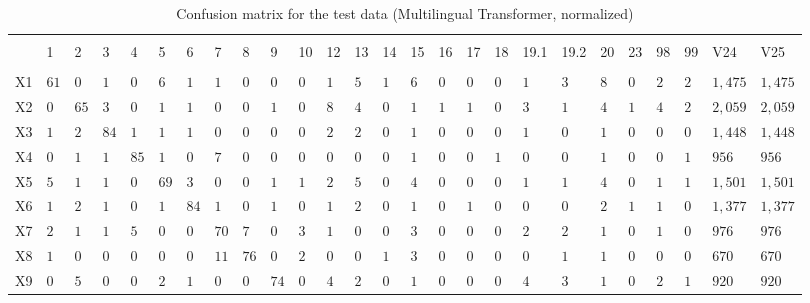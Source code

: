 
\begin{table}[!htbp] \centering 
  \caption{Confusion matrix for the test data (Multilingual Transformer, normalized)} 
  \label{tab:confusion-tf} 
\begin{tabularx}{\textwidth}{r|XXXXXXXXXXXXXXXXXXXXXXXXX} 
\\[-1.8ex]\hline 
\hline \\[-1.8ex] 
 & 1 & 2 & 3 & 4 & 5 & 6 & 7 & 8 & 9 & 10 & 12 & 13 & 14 & 15 & 16 & 17 & 18 & 19.1 & 19.2 & 20 & 23 & 98 & 99 & V24 & V25 \\ 
\hline \\[-1.8ex] 
X1 & $61$ & $0$ & $1$ & $0$ & $6$ & $1$ & $1$ & $0$ & $0$ & $0$ & $1$ & $5$ & $1$ & $6$ & $0$ & $0$ & $0$ & $1$ & $3$ & $8$ & $0$ & $2$ & $2$ & $1,475$ & $1,475$ \\ 
X2 & $0$ & $65$ & $3$ & $0$ & $1$ & $1$ & $0$ & $0$ & $1$ & $0$ & $8$ & $4$ & $0$ & $1$ & $1$ & $1$ & $0$ & $3$ & $1$ & $4$ & $1$ & $4$ & $2$ & $2,059$ & $2,059$ \\ 
X3 & $1$ & $2$ & $84$ & $1$ & $1$ & $1$ & $0$ & $0$ & $0$ & $0$ & $2$ & $2$ & $0$ & $1$ & $0$ & $0$ & $0$ & $1$ & $0$ & $1$ & $0$ & $0$ & $0$ & $1,448$ & $1,448$ \\ 
X4 & $0$ & $1$ & $1$ & $85$ & $1$ & $0$ & $7$ & $0$ & $0$ & $0$ & $0$ & $0$ & $0$ & $1$ & $0$ & $0$ & $1$ & $0$ & $0$ & $1$ & $0$ & $0$ & $1$ & $956$ & $956$ \\ 
X5 & $5$ & $1$ & $1$ & $0$ & $69$ & $3$ & $0$ & $0$ & $1$ & $1$ & $2$ & $5$ & $0$ & $4$ & $0$ & $0$ & $0$ & $1$ & $1$ & $4$ & $0$ & $1$ & $1$ & $1,501$ & $1,501$ \\ 
X6 & $1$ & $2$ & $1$ & $0$ & $1$ & $84$ & $1$ & $0$ & $1$ & $0$ & $1$ & $2$ & $0$ & $1$ & $0$ & $1$ & $0$ & $0$ & $0$ & $2$ & $1$ & $1$ & $0$ & $1,377$ & $1,377$ \\ 
X7 & $2$ & $1$ & $1$ & $5$ & $0$ & $0$ & $70$ & $7$ & $0$ & $3$ & $1$ & $0$ & $0$ & $3$ & $0$ & $0$ & $0$ & $2$ & $2$ & $1$ & $0$ & $1$ & $0$ & $976$ & $976$ \\ 
X8 & $1$ & $0$ & $0$ & $0$ & $0$ & $0$ & $11$ & $76$ & $0$ & $2$ & $0$ & $0$ & $1$ & $3$ & $0$ & $0$ & $0$ & $0$ & $1$ & $1$ & $0$ & $0$ & $0$ & $670$ & $670$ \\ 
X9 & $0$ & $5$ & $0$ & $0$ & $2$ & $1$ & $0$ & $0$ & $74$ & $0$ & $4$ & $2$ & $0$ & $1$ & $0$ & $0$ & $0$ & $4$ & $3$ & $1$ & $0$ & $2$ & $1$ & $920$ & $920$ \\ 

\end{tabularx}
\end{table}
